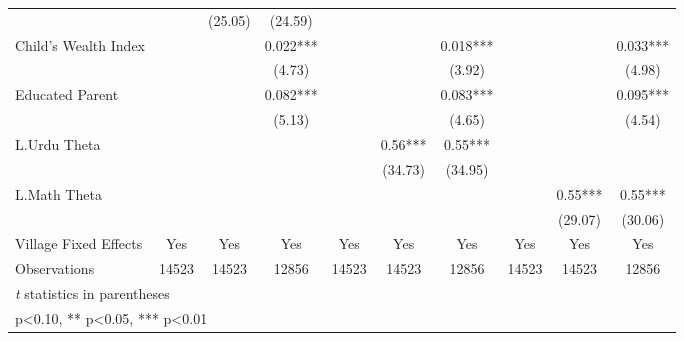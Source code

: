 \begin{sidewaystable}[htbp]
\begin{tabular}{l*{9}{c}}
                &            &  (25.05)   &  (24.59)   &            &            &            &            &            &            \\
Child's Wealth Index&            &            &    0.022***&            &            &    0.018***&            &            &    0.033***\\
                &            &            &   (4.73)   &            &            &   (3.92)   &            &            &   (4.98)   \\
Educated Parent &            &            &    0.082***&            &            &    0.083***&            &            &    0.095***\\
                &            &            &   (5.13)   &            &            &   (4.65)   &            &            &   (4.54)   \\
L.Urdu Theta    &            &            &            &            &     0.56***&     0.55***&            &            &            \\
                &            &            &            &            &  (34.73)   &  (34.95)   &            &            &            \\
L.Math Theta    &            &            &            &            &            &            &            &     0.55***&     0.55***\\
                &            &            &            &            &            &            &            &  (29.07)   &  (30.06)   \\
Village Fixed Effects&      Yes   &      Yes   &      Yes   &      Yes   &      Yes   &      Yes   &      Yes   &      Yes   &      Yes   \\
\midrule
Observations    &    14523   &    14523   &    12856   &    14523   &    14523   &    12856   &    14523   &    14523   &    12856   \\
\bottomrule
\multicolumn{10}{l}{\footnotesize \textit{t} statistics in parentheses}\\
\multicolumn{10}{l}{\footnotesize * p<0.10, ** p<0.05, *** p<0.01}\\
\end{tabular}
\end{sidewaystable}
